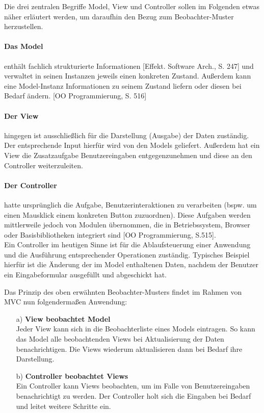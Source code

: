 Die drei zentralen Begriffe Model, View und Controller sollen im Folgenden etwas näher erläutert werden, um daraufhin den Bezug zum Beobachter-Muster herzustellen.

\paragraph{Das Model} enthält fachlich strukturierte Informationen [Effekt. Software Arch., S. 247] und verwaltet in seinen Instanzen jeweils einen konkreten Zustand. Außerdem kann eine Model-Instanz Informationen zu seinem Zustand liefern oder diesen bei Bedarf ändern. [OO Programmierung, S. 516] 

\paragraph{Der View} hingegen ist ausschließlich für die Darstellung (Ausgabe) der Daten zuständig. Der entsprechende Input hierfür wird von den Models geliefert. Außerdem hat ein View die Zusatzaufgabe Benutzereingaben entgegenzunehmen und diese an den Controller weiterzuleiten. %

\paragraph{Der Controller} hatte ursprünglich die Aufgabe, Benutzerinteraktionen zu verarbeiten (bspw. um einen Mausklick einem konkreten Button zuzuordnen). Diese Aufgaben werden mittlerweile jedoch von Modulen übernommen, die in Betriebssystem, Browser oder Basisbibliotheken integriert sind [OO Programmierung, S.515].\\
Ein Controller im heutigen Sinne ist für die Ablaufsteuerung einer Anwendung und die Ausführung entsprechender Operationen zuständig. Typisches Beispiel hierfür ist die Änderung der im Model enthaltenen Daten, nachdem der Benutzer ein Eingabeformular ausgefüllt und abgeschickt hat.

Das Prinzip des oben erwähnten Beobachter-Musters findet im Rahmen von MVC nun folgendermaßen Anwendung: 
\begin{itemize}
	\item[a)] \textbf{View beobachtet Model}\\
	Jeder View kann sich in die Beobachterliste eines Models eintragen. So kann das Model alle beobachtenden Views bei Aktualisierung der Daten benachrichtigen. Die Views wiederum aktualisieren dann bei Bedarf ihre Darstellung.
	\item[b)] \textbf{Controller beobachtet Views}\\
	Ein Controller kann Views beobachten, um im Falle von Benutzereingaben benachrichtigt zu werden. Der Controller holt sich die Eingaben bei Bedarf und leitet weitere Schritte ein.
\end{itemize}


